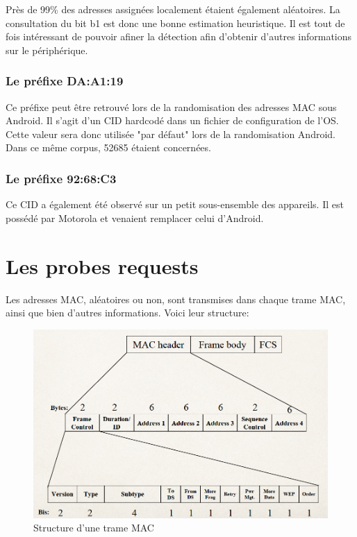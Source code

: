 Près de 99\% des adresses assignées localement étaient également aléatoires. La consultation
du bit b1 est donc une bonne estimation heuristique. Il est tout de fois intéressant de pouvoir afiner
la détection afin d'obtenir d'autres informations sur le périphérique. 

\subsubsection{Le préfixe DA:A1:19}
Ce préfixe peut être retrouvé lors de la randomisation des adresses MAC sous Android.
Il s'agit d'un CID hardcodé dans un fichier de configuration de l'OS. Cette valeur sera donc utilisée "par défaut"
lors de la randomisation Android. Dans ce même corpus, 52685 étaient concernées.

\subsubsection{Le préfixe 92:68:C3}
Ce CID a également été observé sur un petit sous-ensemble des appareils. Il est possédé par Motorola et venaient remplacer
celui d'Android.

\section{Les probes requests}

Les adresses MAC, aléatoires ou non, sont transmises dans chaque trame MAC, ainsi que bien d'autres
informations. Voici leur structure:

\begin{figure}[H]
	\centering
	\includegraphics[width=14cm]{images/probe/mac_frame.png}
	\caption{Structure d'une trame MAC}
	\label{fig:macframe}
\end{figure}


